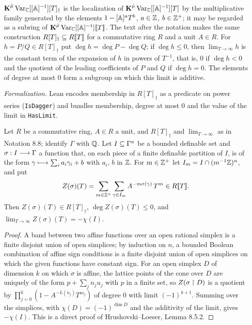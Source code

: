 \setcounter{theorem}{7}
\begin{definition}
\label{dag-loc}
\leanok
{}
$\operatorname{\mathbf{K}}^{\hat\mu}\mathrm{Var}_{\mathbb{C}}[[\mathbb{A}]^{-1}][T]_{\dagger}$ is the localization of $\operatorname{\mathbf{K}}^{\hat\mu}\mathrm{Var}_{\mathbb{C}}[[\mathbb{A}]^{-1}][T]$ by the multiplicative family generated by the elements $1 - [\mathbb{A}]^a T^b$, $a \in \mathbb{Z}$, $b \in \mathbb{Z}^+$; it may be regarded as a subring of $\operatorname{\mathbf{K}}^{\hat\mu}\mathrm{Var}_{\mathbb{C}}[[\mathbb{A}]^{-1}][\![T]\!]$. The text after the notation makes the same construction $R[T]_{\dagger} \subseteq R[\![T]\!]$ for a commutative ring $R$ and a unit $A \in R$. For $h = P/Q \in R[T]_{\dagger}$ put $\deg h = \deg P - \deg Q$; if $\deg h \leq 0$, then $\lim_{T \to \infty} h$ is the constant term of the expansion of $h$ in powers of $T^{-1}$, that is, $0$ if $\deg h < 0$ and the quotient of the leading coefficients of $P$ and $Q$ if $\deg h = 0$. The elements of degree at most $0$ form a subgroup on which this limit is additive.

\emph{Formalization.} Lean encodes membership in $R[T]_{\dagger}$ as a predicate on power series (\texttt{IsDagger}) and bundles membership, degree at most $0$ and the value of the limit in \texttt{HasLimit}.
\end{definition}

\setcounter{theorem}{8}
\begin{lemma}
\label{lat-zeta}
\leanok
{}
Let $R$ be a commutative ring, $A \in R$ a unit, and $R[T]_{\dagger}$ and $\lim_{T \to \infty}$ as in Notation 8.8; identify $\Gamma$ with $\mathbb{Q}$. Let $I \subseteq \Gamma^n$ be a bounded definable set and $\sigma : I \longrightarrow \Gamma$ a function that, on each piece of a finite definable partition of $I$, is of the form $\gamma \longmapsto \sum_i a_i \gamma_i + b$ with $a_i$, $b$ in $\mathbb{Z}$. For $m \in \mathbb{Z}^+$ let $I_m = I \cap (m^{-1}\mathbb{Z})^n$, and put \[ Z(\sigma)(T) = \sum_{m \in \mathbb{Z}^+} \sum_{\gamma \in I_m} A^{-m\sigma(\gamma)}\, T^m \in R[\![T]\!]. \] Then $Z(\sigma)(T) \in R[T]_{\dagger}$, $\deg Z(\sigma)(T) \leq 0$, and $\lim_{T \to \infty} Z(\sigma)(T) = -\chi(I)$.
\end{lemma}

\begin{proof}
\leanok
A band between two affine functions over an open rational simplex is a finite disjoint union of open simplices; by induction on $n$, a bounded Boolean combination of affine sign conditions is a finite disjoint union of open simplices on which the given functions have constant sign. For an open simplex $D$ of dimension $k$ on which $\sigma$ is affine, the lattice points of the cone over $D$ are uniquely of the form $p + \sum_j n_j u_j$ with $p$ in a finite set, so $Z(\sigma \upharpoonright D)$ is a quotient by $\prod_{j=0}^{k}(1 - A^{-L(u_j)}T^{m_j})$ of degree $0$ with limit $(-1)^{k+1}$. Summing over the simplices, with $\chi(D) = (-1)^{\dim D}$ and the additivity of the limit, gives $-\chi(I)$. This is a direct proof of Hrushovski--Loeser, Lemma 8.5.2.
\end{proof}

